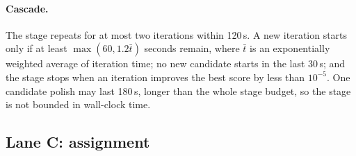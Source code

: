 \paragraph{Cascade.} The stage repeats for at most two iterations within 120\,s. A
new iteration starts only if at least $\max(60,1.2\bar t)$ seconds remain, where
$\bar t$ is an exponentially weighted average of iteration time; no new candidate starts in the last
30\,s; and the stage stops when an iteration improves the best score by less than
$10^{-5}$. One candidate polish may last 180\,s, longer than the whole stage
budget, so the stage is not bounded in wall-clock time.

\subsection{Lane C: assignment}\label{app:alg-lanec}

